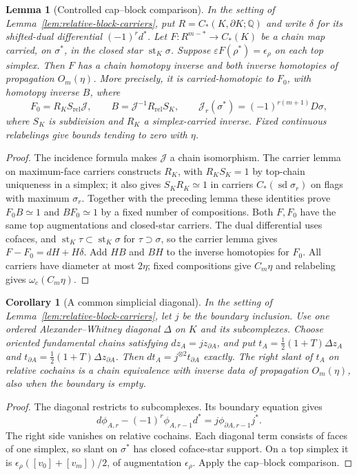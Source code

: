 \documentclass[11pt]{amsart}
\numberwithin{equation}{section}
\newtheorem{lemma}[lemma]{Lemma}
\newtheorem{corollary}[corollary]{Corollary}
\theoremstyle{definition}
\theoremstyle{remark}
\newcommand{\Q}{\mathbb Q}
\begin{document}
\begin{lemma}[Controlled cap--block comparison]
\label{lem:cap-block-comparison}
In the setting of Lemma~\ref{lem:relative-block-carriers}, put
$R=C_*(K,\partial K;\Q)$ and write $\delta$ for its shifted-dual
differential $(-1)^rd^*$. Let $F:R^{m-*}\to C_*(K)$ be a chain map
carried, on $\sigma^*$, in the closed star $\operatorname{st}_K\sigma$.  Suppose
$\varepsilon F(\rho^*)=\epsilon_\rho$ on each top simplex.
Then $F$ has a chain homotopy inverse and both inverse homotopies of propagation
$O_m(\eta)$.  More precisely, it is carried-homotopic to $F_0$, with
homotopy inverse $B$, where
\[
F_0=R_KS_{\mathrm{rel}}\mathcal J,
\qquad B=\mathcal J^{-1}R_{\mathrm{rel}}S_K,
\qquad\mathcal J_r(\sigma^*)=(-1)^{r(m+1)}D\sigma,
\]
where $S_K$ is subdivision and $R_K$ a simplex-carried inverse.
Fixed continuous relabelings give bounds tending to zero with $\eta$.
\end{lemma}
\begin{proof}
The incidence formula makes $\mathcal J$ a chain isomorphism.
The carrier lemma on maximum-face carriers constructs $R_K$, with
$R_KS_K=1$ by top-chain uniqueness in a simplex; it also gives
$S_KR_K\simeq1$ in carriers $C_*(\operatorname{sd}\sigma_r)$ on flags
with maximum $\sigma_r$.  Together with the preceding lemma these
identities prove $F_0B\simeq1$ and $BF_0\simeq1$ by a fixed number of
compositions.  Both $F,F_0$ have the same top augmentations and closed-star
carriers.  The dual differential uses cofaces, and
$\operatorname{st}_K\tau\subset\operatorname{st}_K\sigma$ for
$\tau\supset\sigma$, so the carrier lemma gives $F-F_0=dH+H\delta$.
Add $HB$ and $BH$ to the inverse homotopies for $F_0$.
All carriers have diameter at most $2\eta$; fixed compositions give
$C_m\eta$ and relabeling gives $\omega_c(C_m\eta)$.
\end{proof}

\begin{corollary}[A common simplicial diagonal]
\label{cor:common-diagonal-control}
In the setting of Lemma~\ref{lem:relative-block-carriers}, let
$j$ be the boundary inclusion.
Use one ordered Alexander--Whitney diagonal $\Delta$ on $K$ and its subcomplexes.
Choose oriented fundamental chains satisfying $dz_A=jz_{\partial A}$, and put
$t_A=\frac12(1+T)\Delta z_A$ and
$t_{\partial A}=\frac12(1+T)\Delta z_{\partial A}$.
Then $dt_A=j^{\otimes2}t_{\partial A}$ exactly. The right slant of $t_A$
on relative cochains is a chain equivalence with inverse data of propagation
$O_m(\eta)$, also when the boundary is empty.
\end{corollary}
\begin{proof}
The diagonal restricts to subcomplexes.  Its boundary equation gives
\[
d\phi_{A,r}-(-1)^r\phi_{A,r-1}d^*
=j\phi_{\partial A,r-1}j^*.
\]
The right side vanishes on relative cochains.  Each diagonal term consists of faces of one simplex, so slant
on $\sigma^*$ has closed coface-star support.  On a top simplex it is
$\epsilon_\rho([v_0]+[v_m])/2$, of augmentation $\epsilon_\rho$.
Apply the cap--block comparison.
\end{proof}
\end{document}

